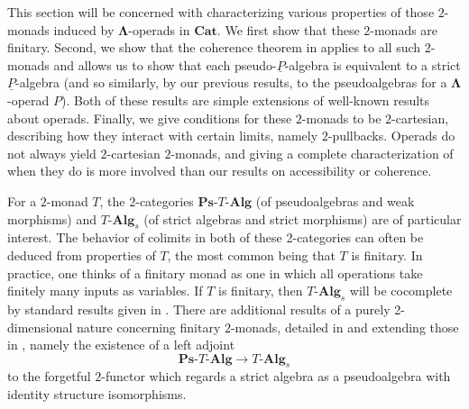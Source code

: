 \documentclass{amsbook} %
\newcommand{\mb}{\mathbf}
\newcommand{\ML}{\mathbf{\Lambda}}
\numberwithin{section}{chapter}
\begin{document}
This section will be concerned with characterizing various properties of those $2$-monads induced by $\ML$-operads in $\mb{Cat}$. We first show that these $2$-monads are finitary.  Second, we show that the coherence theorem in \cite{lack-cod} applies to all such $2$-monads and allows us to show that each pseudo-$\underline{P}$-algebra is equivalent to a strict $\underline{P}$-algebra (and so similarly, by our previous results, to the pseudoalgebras for a $\ML$-operad $P$).  Both of these results are simple extensions of well-known results about operads.  Finally, we give conditions for these $2$-monads to be $2$-cartesian, describing how they interact with certain limits, namely $2$-pullbacks. Operads do not always yield $2$-cartesian $2$-monads, and giving a complete characterization of when they do is more involved than our results on accessibility or coherence.

 For a $2$-monad $T$, the $2$-categories $\mb{Ps}\mbox{-}T\mbox{-}\mb{Alg}$ (of pseudoalgebras and weak morphisms) and $T\mbox{-}\mb{Alg}_s$ (of strict algebras and strict morphisms) are of particular interest. The behavior of colimits in both of these 2-categories can often be deduced from properties of $T$, the most common being that $T$ is finitary.  In practice, one thinks of a finitary monad as one in which all operations take finitely many inputs as variables.  If $T$ is finitary, then $T\mbox{-}\mb{Alg}_s$ will be cocomplete by standard results given in \cite{BKP}.  There are additional results of a purely 2-dimensional nature concerning finitary $2$-monads, detailed in \cite{lack-cod} and extending those in \cite{BKP}, namely the existence of a left adjoint
    \[
        \mb{Ps}\mbox{-}T\mbox{-}\mb{Alg} \rightarrow T\mbox{-}\mb{Alg}_s
    \]
to the forgetful $2$-functor which regards a strict algebra as a pseudoalgebra with identity structure isomorphisms.
\end{document}
